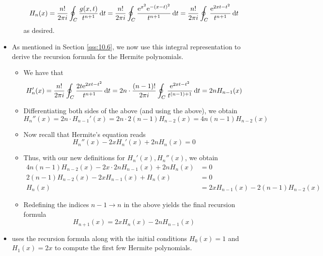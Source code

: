 \documentclass[../finalProject.tex]{subfiles}
\begin{document}
\begin{itemize}
\begin{itemize}
\begin{equation*}
            H_n(x) = \frac{n!}{2\pi i}\oint_C\frac{g(x,t)}{t^{n+1}}\dd{t}
            = \frac{n!}{2\pi i}\oint_C\frac{\e[x^2]\e[-(x-t)^2]}{t^{n+1}}\dd{t}
            = \frac{n!}{2\pi i}\oint_C\frac{\e[2xt-t^2]}{t^{n+1}}\dd{t}
        \end{equation*}
        as desired.
    \end{itemize}
    \item As mentioned in Section \ref{sss:10.6}, we now use this integral representation to derive the recursion formula for the Hermite polynomials.
    \begin{itemize}
        \item We have that
        \begin{equation*}
            H_n'(x) = \frac{n!}{2\pi i}\oint_C\frac{2t\e[2xt-t^2]}{t^{n+1}}\dd{t}
            = 2n\cdot \frac{(n-1)!}{2\pi i}\oint_C\frac{\e[2xt-t^2]}{t^{(n-1)+1}}\dd{t}
            = 2nH_{n-1}(x)
        \end{equation*}
        \item Differentiating both sides of the above (and using the above), we obtain
        \begin{equation*}
            H_n''(x) = 2n\cdot H_{n-1}'(x)
            = 2n\cdot 2(n-1)H_{n-2}(x)
            = 4n(n-1)H_{n-2}(x)
        \end{equation*}
        \item Now recall that Hermite's equation reads
        \begin{equation*}
            H_n''(x)-2xH_n'(x)+2nH_n(x) = 0
        \end{equation*}
        \item Thus, with our new definitions for $H_n'(x),H_n''(x)$, we obtain
        \begin{align*}
            4n(n-1)H_{n-2}(x)-2x\cdot 2nH_{n-1}(x)+2nH_n(x) &= 0\\
            2(n-1)H_{n-2}(x)-2xH_{n-1}(x)+H_n(x) &= 0\\
            H_n(x) &= 2xH_{n-1}(x)-2(n-1)H_{n-2}(x)
        \end{align*}
        \item Redefining the indices $n-1\to n$ in the above yields the final recursion formula
        \begin{equation*}
            H_{n+1}(x) = 2xH_n(x)-2nH_{n-1}(x)
        \end{equation*}
    \end{itemize}
    \item \textcite{bib:Seaborn} uses the recursion formula along with the initial conditions $H_0(x)=1$ and $H_1(x)=2x$ to compute the first few Hermite polynomials.
\end{itemize}
\end{document}
